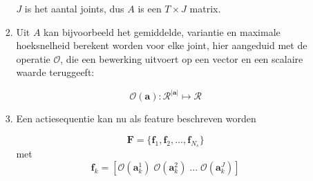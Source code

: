 \begin{itemize}
\begin{itemize}
\begin{enumerate}
			$J$ is het aantal joints,	dus $A$ is een $T \times J$ matrix.
			
			\item Uit $A$ kan bijvoorbeeld het gemiddelde, variantie en maximale hoeksnelheid berekent worden voor elke joint, hier aangeduid met de operatie $\mathcal{O}$, die een bewerking uitvoert op een vector en een scalaire waarde teruggeeft:
			
			$$\mathcal{O}(\textbf{a}) : \mathcal{R}^{|\textbf{a}|} \mapsto \mathcal{R}$$
			
			\item Een actiesequentie kan nu als feature beschreven worden
			
			$$\textbf{F} = \{\textbf{f}_1, \textbf{f}_2, ..., \textbf{f}_{N_{s}}\}$$
			met
			$$\textbf{f}_k = [\mathcal{O}(\textbf{a}_k^1)\; \mathcal{O}(\textbf{a}_k^2) \; ... \; \mathcal{O}(\textbf{a}_k^J)]$$
			

\end{enumerate}
\end{itemize}
\end{itemize}
